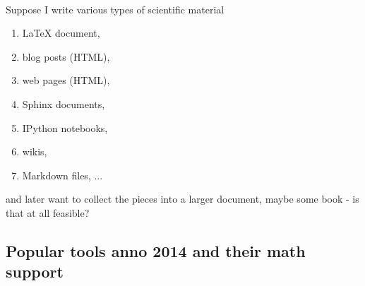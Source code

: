 \documentclass[%
twoside,                 %
final,                   %
10pt]{article}
\begin{document}
\paragraph{}
Suppose I write various types of scientific material
\begin{enumerate}
\item {\LaTeX} document,

\item blog posts (HTML),

\item web pages (HTML),

\item Sphinx documents,

\item IPython notebooks,

\item wikis,

\item Markdown files, ...
\end{enumerate}

\noindent
and later want to collect the pieces into a larger document, maybe some book - is that at all feasible?




\subsection*{Popular tools anno 2014 and their math support}

\end{document}
